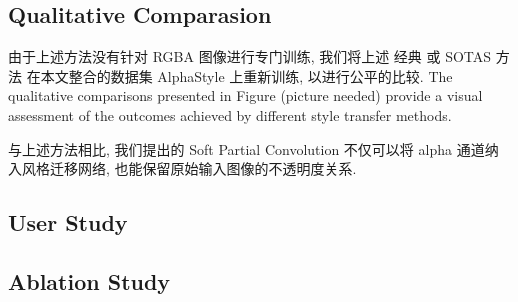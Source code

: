 
\subsection{Qualitative Comparasion}

由于上述方法没有针对 RGBA 图像进行专门训练, 我们将上述 经典 或 SOTAS 方法 在本文整合的数据集 AlphaStyle 上重新训练, 以进行公平的比较. The qualitative comparisons presented in Figure (picture needed) provide a visual assessment of the outcomes achieved by different style transfer methods.


与上述方法相比, 我们提出的 Soft Partial Convolution 不仅可以将 alpha 通道纳入风格迁移网络, 也能保留原始输入图像的不透明度关系.
\subsection{User Study}


\subsection{Ablation Study}